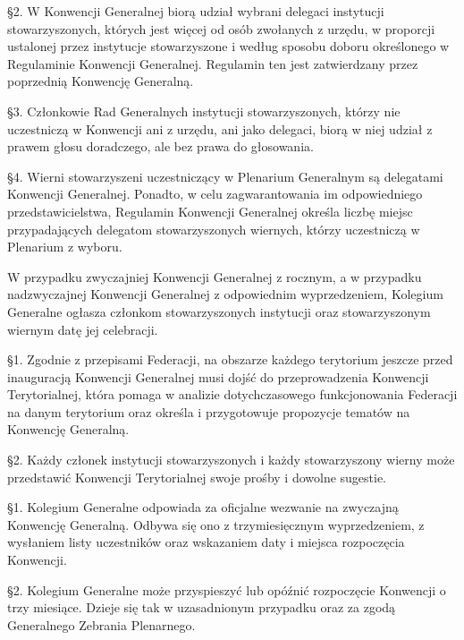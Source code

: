 \S{}2. W Konwencji Generalnej biorą udział wybrani delegaci instytucji stowarzyszonych, których jest więcej od osób zwołanych z urzędu, w proporcji ustalonej przez instytucje stowarzyszone i według sposobu doboru określonego w Regulaminie Konwencji Generalnej. Regulamin ten jest zatwierdzany przez poprzednią Konwencję Generalną.


\S{}3. Członkowie Rad Generalnych instytucji stowarzyszonych, którzy nie uczestniczą w Konwencji ani z urzędu, ani jako delegaci, biorą w niej udział z prawem głosu doradczego, ale bez prawa do głosowania.


\S{}4. Wierni stowarzyszeni uczestniczący w Plenarium Generalnym są delegatami Konwencji Generalnej. Ponadto, w celu zagwarantowania im odpowiedniego  przedstawicielstwa, Regulamin Konwencji Generalnej określa liczbę miejsc przypadających delegatom stowarzyszonych wiernych, którzy uczestniczą w Plenarium z wyboru.
 


 W przypadku zwyczajniej Konwencji Generalnej z rocznym, a w przypadku nadzwyczajnej Konwencji Generalnej z odpowiednim wyprzedzeniem, Kolegium Generalne ogłasza członkom stowarzyszonych instytucji oraz stowarzyszonym wiernym datę jej celebracji.












 \S{}1. Zgodnie z przepisami Federacji, na obszarze każdego terytorium jeszcze przed inauguracją Konwencji Generalnej musi dojść do przeprowadzenia Konwencji Terytorialnej, która pomaga w analizie dotychczasowego funkcjonowania Federacji na danym terytorium oraz określa i przygotowuje propozycje tematów na Konwencję Generalną.


\S{}2. Każdy członek instytucji stowarzyszonych i każdy stowarzyszony wierny może przedstawić Konwencji Terytorialnej swoje prośby i dowolne sugestie.
 


 \S{}1.  Kolegium Generalne odpowiada za oficjalne wezwanie na zwyczajną Konwencję Generalną. Odbywa się ono z trzymiesięcznym wyprzedzeniem, z wysłaniem listy uczestników oraz wskazaniem daty i miejsca rozpoczęcia Konwencji.


\S{}2. Kolegium Generalne może przyspieszyć lub opóźnić rozpoczęcie Konwencji o trzy miesiące. Dzieje się tak w uzasadnionym przypadku oraz za zgodą Generalnego Zebrania Plenarnego.
 
